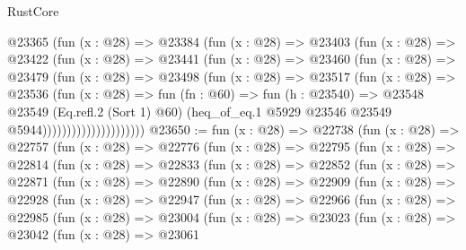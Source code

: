 \begin{lexlean}{RustCore}
\begin{coremodule}
                      @23365
                        (fun (x : @28) =>
                        @23384
                          (fun (x : @28) =>
                          @23403
                            (fun (x : @28) =>
                            @23422
                              (fun (x : @28) =>
                              @23441
                                (fun (x : @28) =>
                                @23460
                                  (fun (x : @28) =>
                                  @23479
                                    (fun (x : @28) =>
                                    @23498
                                      (fun (x : @28) =>
                                      @23517
                                        (fun (x : @28) =>
                                        @23536
                                          (fun (x : @28) =>
                                          fun (fn : @60) =>
                                          fun (h : @23540) =>
                                          @23548
                                            @23549
                                            (Eq.refl.{2} (Sort 1) @60)
                                            (heq_of_eq.{1}
                                              @5929
                                              @23546
                                              @23549
                                              @5944)))))))))))))))))))))
@23650 := fun (x : @28) =>
  @22738
    (fun (x : @28) =>
    @22757
      (fun (x : @28) =>
      @22776
        (fun (x : @28) =>
        @22795
          (fun (x : @28) =>
          @22814
            (fun (x : @28) =>
            @22833
              (fun (x : @28) =>
              @22852
                (fun (x : @28) =>
                @22871
                  (fun (x : @28) =>
                  @22890
                    (fun (x : @28) =>
                    @22909
                      (fun (x : @28) =>
                      @22928
                        (fun (x : @28) =>
                        @22947
                          (fun (x : @28) =>
                          @22966
                            (fun (x : @28) =>
                            @22985
                              (fun (x : @28) =>
                              @23004
                                (fun (x : @28) =>
                                @23023
                                  (fun (x : @28) =>
                                  @23042
                                    (fun (x : @28) =>
                                    @23061

\end{coremodule}
\end{lexlean}
